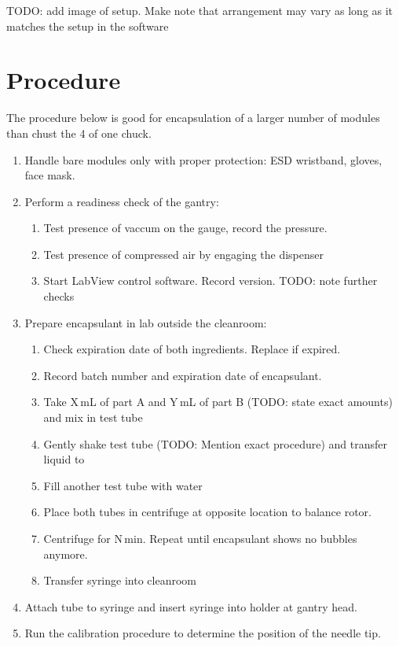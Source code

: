 \documentclass[12pt]{unlsilabsop}
\begin{document}
TODO: add image of setup. Make note that arrangement may vary as long as it matches the setup in the software

\section{Procedure}

The procedure below is good for encapsulation of a larger number of modules than chust the 4 of one chuck.
\begin{enumerate}
    \item Handle bare modules only with proper protection: ESD wristband, gloves, face mask.
    \item Perform a readiness check of the gantry:
    \begin{enumerate}
	\item Test presence of vaccum on the gauge, record the pressure.
	\item Test presence of compressed air by engaging the dispenser
	\item Start LabView control software. Record version. TODO: note further checks
    \end{enumerate}
    \item Prepare encapsulant in lab outside the cleanroom:\label{enum:prepencapsulant}
    \begin{enumerate}
	\item Check expiration date of both ingredients. Replace if expired.
	\item Record batch number and expiration date of encapsulant.
	\item Take X\,mL of part A and Y\,mL of part B (TODO: state exact amounts) and mix in test tube
	\item Gently shake test tube (TODO: Mention exact procedure) and transfer liquid to 
	\item Fill another test tube with water
	\item Place both tubes in centrifuge at opposite location to balance rotor.
	\item Centrifuge for N\,min. Repeat until encapsulant shows no bubbles anymore.
	\item Transfer syringe into cleanroom
    \end{enumerate}
    \item Attach tube to syringe and insert syringe into holder at gantry head.
    \item Run the calibration procedure to determine the position of the needle tip.

\end{enumerate}
\end{document}
